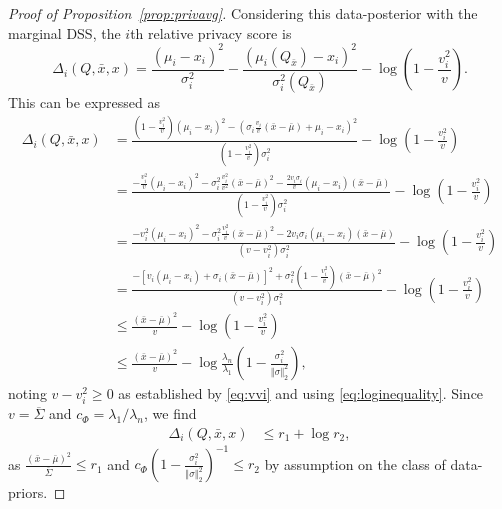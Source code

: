 \documentclass{article}
\theoremstyle{plain}
\theoremstyle{plain}
\theoremstyle{definition}
\theoremstyle{remark}
\theoremstyle{plain}
\begin{document}
\begin{proof}[Proof of Proposition~\ref{prop:privavg}]
    Considering this data-posterior with the marginal DSS, the $i$th relative privacy score is
    \begin{equation*}
        \Delta_i(Q,\bar{x},x) = \frac{(\mu_i - x_i)^2}{\sigma_i^2} - \frac{(\mu_i(Q_{\bar{x}}) - x_i)^2}{\sigma_i^2(Q_{\bar{x}})} -\log\left(1 - \frac{v_i^2}{v}\right).
    \end{equation*}
    This can be expressed as 
    \begin{align*}
        \Delta_i(Q,\bar{x},x) &= \frac{\left(1 - \frac{v_i^2}{v}\right)(\mu_i - x_i)^2 -(\sigma_i\frac{v_i}{v}(\bar{x} - \bar{\mu}) + \mu_i - x_i)^2}{\left(1 - \frac{v_i^2}{v}\right)\sigma_i^2} - \log\left(1 - \frac{v_i^2}{v}\right) \\
        &= \frac{-\frac{v_i^2}{v}(\mu_i - x_i)^2 - \sigma_i^2\frac{v_i^2}{v^2} (\bar{x} - \bar{\mu})^2 - \frac{2 v_i \sigma_i}{v} (\mu_i - x_i)(\bar{x} - \bar{\mu})}{\left(1 - \frac{v_i^2}{v}\right)\sigma_i^2} - \log\left(1 - \frac{v_i^2}{v}\right) \\
        &= \frac{-v_i^2(\mu_i - x_i)^2 - \sigma_i^2\frac{v_i^2}{v} (\bar{x} - \bar{\mu})^2 - 2 v_i \sigma_i (\mu_i - x_i)(\bar{x} - \bar{\mu})}{\left(v - v_i^2\right)\sigma_i^2} - \log\left(1 - \frac{v_i^2}{v}\right) \\
        &= \frac{-\left[ v_i(\mu_i - x_i) + \sigma_i(\bar{x} - \bar{\mu}) \right]^2 + \sigma_i^2(1-\frac{v_i^2}{v}) (\bar{x} - \bar{\mu})^2}{\left(v - v_i^2\right)\sigma_i^2} - \log\left(1 - \frac{v_i^2}{v}\right) \\
        & \leq \frac{(\bar{x} - \bar{\mu})^2}{v} - \log\left(1 - \frac{v_i^2}{v}\right) \\
        & \leq \frac{(\bar{x} - \bar{\mu})^2}{v} - \log \frac{\lambda_n}{\lambda_1}\left(1- \frac{\sigma_i^2}{\Vert\sigma \Vert_2^2} \right),
    \end{align*}
    noting $v-v_i^2 \geq 0$ as established by \eqref{eq:vvi} and using \eqref{eq:loginequality}. Since $v = \overline{\Sigma}$ and $c_\Phi = \lambda_1/\lambda_n$, we find
    \begin{align*}
        \Delta_i(Q,\bar{x},x) 
        & \leq r_1 + \log r_2,
    \end{align*}
    as $\frac{(\bar{x} - \bar{\mu})^2}{\overline{\Sigma}} \leq r_1$ and $c_\Phi\left(1- \frac{\sigma_i^2}{\Vert\sigma \Vert_2^2} \right)^{-1} \leq r_2$ by assumption on the class of data-priors.
\end{proof}
\end{document}
